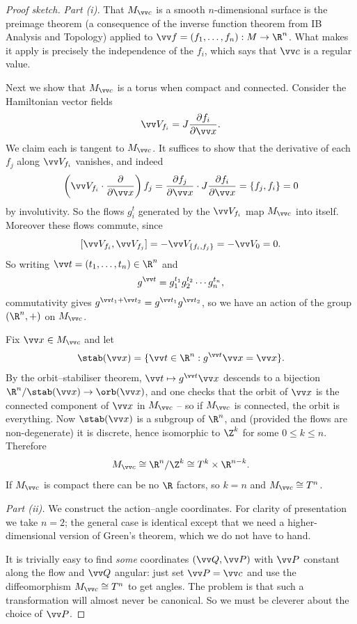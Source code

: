 \begin{proof}[Proof sketch]
	\emph{Part (i).} That $M_{\vv c}$ is a smooth $n$-dimensional surface is the preimage theorem (a consequence of the inverse function theorem from IB Analysis and Topology) applied to $\vv f = (f_1,\dots,f_n) : M \to \R^n$. What makes it apply is precisely the independence of the $f_i$, which says that $\vv c$ is a regular value.

	Next we show that $M_{\vv c}$ is a torus when compact and connected. Consider the Hamiltonian vector fields
	$$
	\vv V_{f_i} = J\frac{\partial f_i}{\partial \vv x}.
	$$
	We claim each is tangent to $M_{\vv c}$. It suffices to show that the derivative of each $f_j$ along $\vv V_{f_i}$ vanishes, and indeed
	$$
	\left(\vv V_{f_i}\cdot\frac{\partial}{\partial \vv x}\right)f_j = \frac{\partial f_j}{\partial \vv x}\cdot J\frac{\partial f_i}{\partial \vv x} = \{f_j, f_i\} = 0
	$$
	by involutivity. So the flows $g_i^{t}$ generated by the $\vv V_{f_i}$ map $M_{\vv c}$ into itself. Moreover these flows commute, since
	$$
	[\vv V_{f_i}, \vv V_{f_j}] = -\vv V_{\{f_i, f_j\}} = -\vv V_0 = 0.
	$$
	So writing $\vv t = (t_1,\dots,t_n)\in\R^n$ and
	$$
	g^{\vv t} = g_1^{t_1}g_2^{t_2}\cdots g_n^{t_n},
	$$
	commutativity gives $g^{\vv t_1 + \vv t_2} = g^{\vv t_1}g^{\vv t_2}$, so we have an action of the group $(\R^n, +)$ on $M_{\vv c}$.

	Fix $\vv x \in M_{\vv c}$ and let
	$$
	\stab(\vv x) = \{\vv t\in\R^n : g^{\vv t}\vv x = \vv x\}.
	$$
	By the orbit--stabiliser theorem, $\vv t \mapsto g^{\vv t}\vv x$ descends to a bijection $\R^n/\stab(\vv x)\to \orb(\vv x)$, and one checks that the orbit of $\vv x$ is the connected component of $\vv x$ in $M_{\vv c}$ -- so if $M_{\vv c}$ is connected, the orbit is everything. Now $\stab(\vv x)$ is a subgroup of $\R^n$, and (provided the flows are non-degenerate) it is discrete, hence isomorphic to $\Z^k$ for some $0 \le k \le n$. Therefore
	$$
	M_{\vv c}\cong \R^n/\Z^k \cong T^k\times\R^{n-k}.
	$$
	If $M_{\vv c}$ is compact there can be no $\R$ factors, so $k = n$ and $M_{\vv c}\cong T^n$.

	\emph{Part (ii).} We construct the action--angle coordinates. For clarity of presentation we take $n = 2$; the general case is identical except that we need a higher-dimensional version of Green's theorem, which we do not have to hand.

	It is trivially easy to find \emph{some} coordinates $(\vv Q, \vv P)$ with $\vv P$ constant along the flow and $\vv Q$ angular: just set $\vv P = \vv c$ and use the diffeomorphism $M_{\vv c}\cong T^n$ to get angles. The problem is that such a transformation will almost never be canonical. So we must be cleverer about the choice of $\vv P$.


\end{proof}
